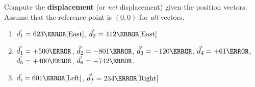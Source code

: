 \documentclass[12pt]{article} %
\newcommand{\tx}[1]{\text{#1}}
\begin{document}
\begin{qstn}[3]
	Compute the \textbf{displacement} (or \emph{net} displacement) given the position vectors. Assume that the reference point is $(0,0)$ for \emph{all} vectors.
    \begin{enumerate}[label=(\alph*)]
        \item $\vec d_1 = 623 \tx{\m}[\tx{East}]$, $\vec d_2 = 412 \tx{\m}[\tx{East}]$
         \vspace*{4cm}
        \item $\vec d_1 = +500\km$, $\vec d_2 = -801\km$, $\vec d_3 = -120\km$, $\vec d_4 = +61\km$, $\vec d_5 = +400\km$, $\vec d_6 = -742\km$.
        \vspace*{12cm}
        \item $\vec d_i = 601\tx{\m}[\tx{Left}]$, $\vec d_f = 234\tx{\m}[\tx{Right}]$
    \end{enumerate}

\end{qstn}
\end{document}
